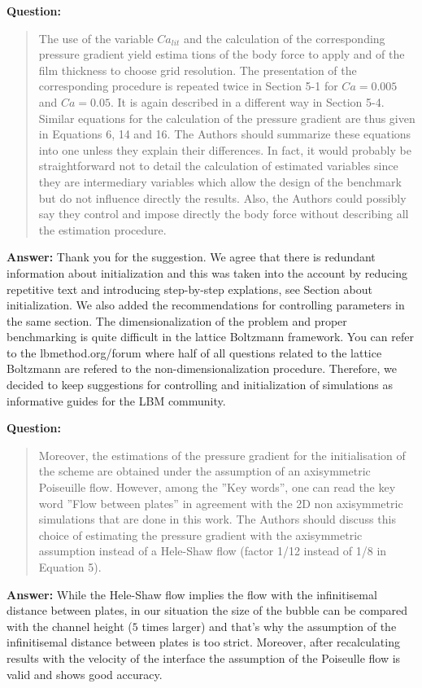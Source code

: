 \documentclass{article}
\begin{document}
\textbf{Question:}
\begin{quotation}
The use of the variable $Ca_{lit}$ and the calculation of the corresponding pressure gradient yield
estima
tions of the body force to apply and of the ﬁlm thickness to choose grid resolution. The
presentation
of the corresponding procedure is repeated twice in Section 5-1 for $Ca=0.005$ and $Ca=0.05$. It is
again described in a diﬀerent way in Section 5-4. Similar equations for the calculation of the
pressure
gradient are thus given in Equations 6, 14 and 16. The Authors should summarize these equations
into one unless they explain their differences. In fact, it would probably be straightforward not to
detail the calculation of estimated variables since they are intermediary variables which allow the
design of the benchmark but do not inﬂuence directly the results. Also, the Authors could possibly
say they control and impose directly the body force without describing all the estimation procedure.
\end{quotation}

\textbf{Answer:} Thank you for the suggestion. We agree that there is redundant information
about initialization and this was taken into the account by reducing repetitive text and
introducing step-by-step explations, see Section about initialization. We also added the
recommendations for controlling parameters in the same section.  The
dimensionalization of the problem and proper benchmarking is quite difficult in the lattice
Boltzmann framework. You can refer to the lbmethod.org/forum where half of all questions related to
the lattice Boltzmann are refered to the non-dimensionalization procedure. Therefore, we decided to
keep suggestions for controlling and initialization of simulations as informative guides for the
LBM community.

\textbf{Question:}
\begin{quotation}
 Moreover, the estimations of the pressure gradient for the initialisation of the scheme are
obtained
under the assumption of an axisymmetric Poiseuille ﬂow. However, among the ”Key words”, one can
read the key word ”Flow between plates” in agreement with the 2D non axisymmetric simulations
that are done in this work. The Authors should discuss this choice of estimating the pressure
gradient with the axisymmetric assumption instead of a Hele-Shaw flow (factor 1/12 instead of 1/8
in Equation 5).
\end{quotation}

\textbf{Answer:} While the Hele-Shaw flow implies the flow with the infinitisemal distance between
plates, in our situation the size of the bubble can be compared with the channel height ($5$ times
larger) and that's why the assumption of the infinitisemal distance between plates is too strict.
Moreover, after recalculating results with the velocity of the interface the assumption of the
Poiseulle flow is valid and shows good accuracy.
\end{document}
